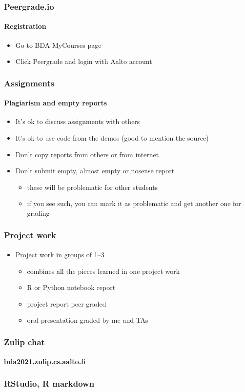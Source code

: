 \documentclass[english]{beamer}
\begin{document}
\begin{frame}
  \frametitle{Peergrade.io}  %
  \framesubtitle{Registration}
  \begin{itemize}
  \item Go to BDA MyCourses page
  \item Click Peergrade and login with Aalto account
  \end{itemize}
  
\end{frame}

\begin{frame}
  \frametitle{Assignments}  %
  \framesubtitle{Plagiarism and empty reports}
  \begin{itemize}
  \item It's ok to discuss assignments with others
  \item It's ok to use code from the demos (good to mention the source)
  \item Don't copy reports from others or from internet
  \item Don't submit empty, almost empty or nosense report
    \begin{itemize}
    \item these will be problematic for other students
    \item if you see such, you can mark it as problematic and get
      another one for grading
    \end{itemize}
  \end{itemize}
  
\end{frame}


\begin{frame}
  \frametitle{Project work}  %
  \framesubtitle{}
  \begin{itemize}
  \item Project work in groups of 1--3
    \begin{itemize}
    \item combines all the pieces learned in one project work
    \item R or Python notebook report
    \item project report peer graded
    \item oral presentation graded by me and TAs
    \end{itemize}
  \end{itemize}
  
\end{frame}

\begin{frame}

  \frametitle{Zulip chat}  %
  \framesubtitle{bda2021.zulip.cs.aalto.fi}
  
\end{frame}

\begin{frame}

  \frametitle{RStudio, R markdown}  %
  \framesubtitle{}
  
\end{frame}  
\end{document}
